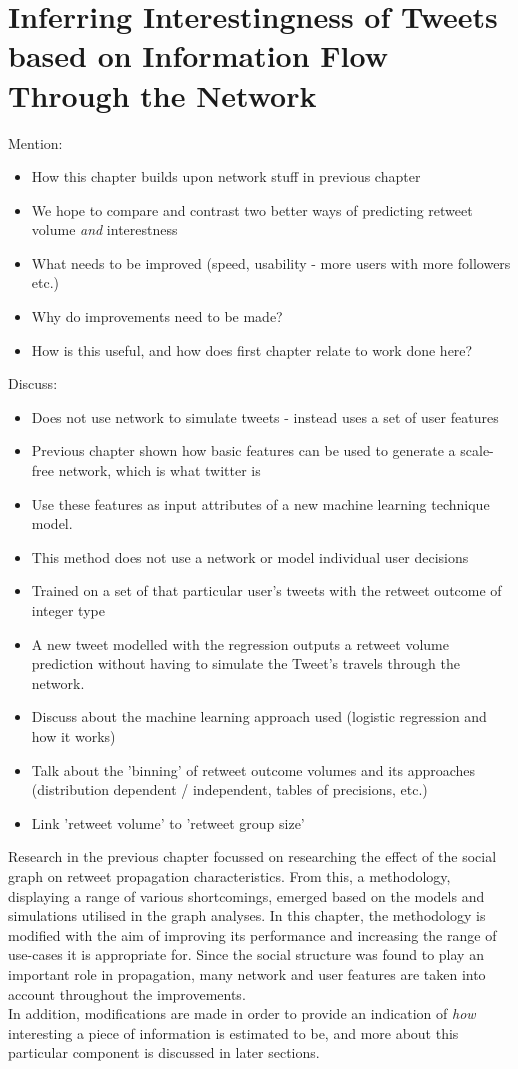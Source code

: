 \chapter{Inferring Interestingness of Tweets based on Information Flow Through the Network}


Mention:
\begin{itemize}
\item How this chapter builds upon network stuff in previous chapter
\item We hope to compare and contrast two better ways of predicting retweet volume \emph{and} interestness
\item What needs to be improved (speed, usability - more users with more followers etc.)
\item Why do improvements need to be made?
\item How is this useful, and how does first chapter relate to work done here?
\end{itemize}

Discuss:
\begin{itemize}
\item Does not use network to simulate tweets - instead uses a set of user features
\item Previous chapter shown how basic features can be used to generate a scale-free network, which is what twitter is
\item Use these features as input attributes of a new machine learning technique model.
\item This method does not use a network or model individual user decisions
\item Trained on a set of that particular user's tweets with the retweet outcome of integer type
\item A new tweet modelled with the regression outputs a retweet volume prediction without having to simulate the Tweet's travels through the network. 
\item Discuss about the machine learning approach used (logistic regression and how it works)
\item Talk about the 'binning' of retweet outcome volumes and its approaches (distribution dependent / independent, tables of precisions, etc.)
\item Link 'retweet volume' to 'retweet group size'
\end{itemize}

Research in the previous chapter focussed on researching the effect of the social graph on retweet propagation characteristics. From this, a methodology, displaying a range of various shortcomings, emerged based on the models and simulations utilised in the graph analyses. In this chapter, the methodology is modified with the aim of improving its performance and increasing the range of use-cases it is appropriate for. Since the social structure was found to play an important role in propagation, many network and user features are taken into account throughout the improvements.\\
In addition, modifications are made in order to provide an indication of \textit{how} interesting a piece of information is estimated to be, and more about this particular component is discussed in later sections.

